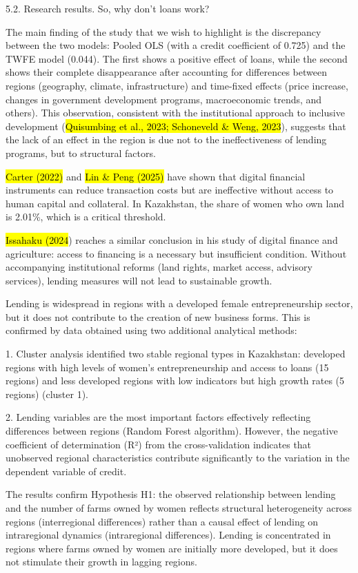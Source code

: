 \documentclass[
]{article}
\begin{document}
5.2. Research results. So, why don't loans work?

The main finding of the study that we wish to highlight is the
discrepancy between the two models: Pooled OLS (with a credit
coefficient of 0.725) and the TWFE model (0.044). The first shows a
positive effect of loans, while the second shows their complete
disappearance after accounting for differences between regions
(geography, climate, infrastructure) and time-fixed effects (price
increase, changes in government development programs, macroeconomic
trends, and others). This observation, consistent with the institutional
approach to inclusive development (\hl{Quisumbing et al., 2023;
Schoneveld \& Weng, 2023}), suggests that the lack of an effect in the
region is due not to the ineffectiveness of lending programs, but to
structural factors.

\hl{Carter (2022)} and \hl{Lin \& Peng (2025)} have shown that digital
financial instruments can reduce transaction costs but are ineffective
without access to human capital and collateral. In Kazakhstan, the share
of women who own land is 2.01\%, which is a critical threshold.

\hl{Issahaku (2024}) reaches a similar conclusion in his study of
digital finance and agriculture: access to financing is a necessary but
insufficient condition. Without accompanying institutional reforms (land
rights, market access, advisory services), lending measures will not
lead to sustainable growth.

Lending is widespread in regions with a developed female
entrepreneurship sector, but it does not contribute to the creation of
new business forms. This is confirmed by data obtained using two
additional analytical methods:

1. Cluster analysis identified two stable regional types in Kazakhstan:
developed regions with high levels of women's entrepreneurship and
access to loans (15 regions) and less developed regions with low
indicators but high growth rates (5 regions) (cluster 1).

2. Lending variables are the most important factors effectively
reflecting differences between regions (Random Forest algorithm).
However, the negative coefficient of determination (R²) from the
cross-validation indicates that unobserved regional characteristics
contribute significantly to the variation in the dependent variable of
credit.

The results confirm Hypothesis H1: the observed relationship between
lending and the number of farms owned by women reflects structural
heterogeneity across regions (interregional differences) rather than a
causal effect of lending on intraregional dynamics (intraregional
differences). Lending is concentrated in regions where farms owned by
women are initially more developed, but it does not stimulate their
growth in lagging regions.
\end{document}
